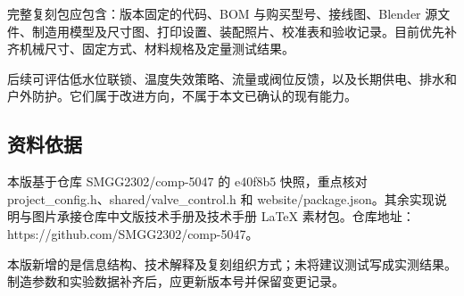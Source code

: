 \documentclass[10pt,a4paper]{article}
\begin{document}
完整复刻包应包含：版本固定的代码、BOM 与购买型号、接线图、Blender 源文件、制造用模型及尺寸图、打印设置、装配照片、校准表和验收记录。目前优先补齐机械尺寸、固定方式、材料规格及定量测试结果。


后续可评估低水位联锁、温度失效策略、流量或阀位反馈，以及长期供电、排水和户外防护。它们属于改进方向，不属于本文已确认的现有能力。


\subsection{资料依据}

本版基于仓库 SMGG2302/comp-5047 的 e40f8b5 快照，重点核对 project\_config.h、shared/valve\_control.h 和 website/package.json。其余实现说明与图片承接仓库中文版技术手册及技术手册 LaTeX 素材包。仓库地址：https://github.com/SMGG2302/comp-5047。


本版新增的是信息结构、技术解释及复刻组织方式；未将建议测试写成实测结果。制造参数和实验数据补齐后，应更新版本号并保留变更记录。
\end{document}
